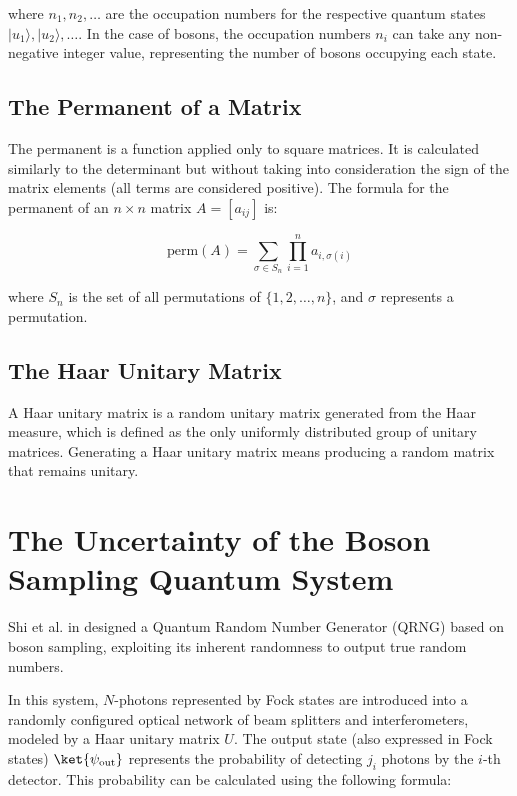where \( n_1, n_2, \dots \) are the occupation numbers for the respective quantum states \( |u_1\rangle, |u_2\rangle, \dots \). In the case of bosons, the occupation numbers \( n_i \) can take any non-negative integer value, representing the number of bosons occupying each state.



\subsection{The Permanent of a Matrix}

The permanent is a function applied only to square matrices. It is calculated similarly to the determinant but without taking into consideration the sign of the matrix elements (all terms are considered positive). The formula for the permanent of an \( n \times n \) matrix \( A = [a_{ij}] \) is:

\begin{equation}
\text{perm}(A) = \sum_{\sigma \in S_n} \prod_{i=1}^{n} a_{i,\sigma(i)}
\end{equation}

where \( S_n \) is the set of all permutations of \( \{1, 2, \dots, n\} \), and \( \sigma \) represents a permutation.

\subsection{The Haar Unitary Matrix}

A Haar unitary matrix is a random unitary matrix generated from the Haar measure, which is defined as the only uniformly distributed group of unitary matrices. Generating a Haar unitary matrix means producing a random matrix that remains unitary.


\section{The Uncertainty of the Boson Sampling Quantum System}

Shi et al. in \cite{shi_Twa3na} designed a Quantum Random Number Generator (QRNG) based on boson sampling, exploiting its inherent randomness to output true random numbers.

In this system, \( N \)-photons represented by Fock states are introduced into a randomly configured optical network of beam splitters and interferometers, modeled by a Haar unitary matrix \( U \). The output state (also expressed in Fock states) \( \ket{\psi_{\text{out}}} \) represents the probability of detecting \( j_i \) photons by the \( i \)-th detector. This probability can be calculated using the following formula:


